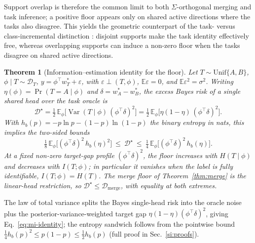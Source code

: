 \documentclass[10pt,a4paper]{article}
\theoremstyle{plain}
\newtheorem{theorem}{Theorem}
\theoremstyle{definition}
\newcommand{\Sig}{\Sigma}
\begin{document}
\noindent Support overlap is therefore the common limit to both
$\Sig$-orthogonal merging and task inference; a positive floor appears only on shared
active directions where the tasks also disagree. This yields the geometric counterpart
of the task- versus class-incremental distinction \cite{vandeven2022}: disjoint
supports make the task identity effectively free, whereas overlapping supports can
induce a non-zero floor when the tasks disagree on shared active directions.

\begin{theorem}[Information--estimation identity for the floor]
\label{thm:mi}
Let $T\sim\mathrm{Unif}\{A,B\}$, $\phi\mid T\sim\mathcal D_T$,
$y=\phi^\top w_T^\ast+\varepsilon$, with $\varepsilon\perp(T,\phi)$,
$\mathbb{E}\varepsilon=0$, and $\mathbb{E}\varepsilon^2=\sigma^2$. Writing
$\eta(\phi)=\Pr(T{=}A\mid\phi)$ and $\delta=w_A^\ast-w_B^\ast$, the excess Bayes risk
of a single shared head over the task oracle is
\begin{equation}
\mathcal{D}^\star
=\tfrac12\,\mathbb{E}_\phi\!\big[\operatorname{Var}(T\!\mid\!\phi)\,(\phi^\top\delta)^2\big]
=\tfrac12\,\mathbb{E}_\phi\!\big[\eta(1-\eta)\,(\phi^\top\delta)^2\big].
\label{eq:mi-identity}
\end{equation}
With $h_b(p)=-p\ln p-(1-p)\ln(1-p)$ the binary entropy in nats, this implies the
two-sided bounds
\begin{equation}
\tfrac18\,\mathbb{E}_\phi\!\big[(\phi^\top\delta)^2\,h_b(\eta)^2\big]\ \le\
\mathcal{D}^\star\ \le\
\tfrac14\,\mathbb{E}_\phi\!\big[(\phi^\top\delta)^2\,h_b(\eta)\big].
\label{eq:mi-sandwich}
\end{equation}
At a fixed non-zero target-gap profile $(\phi^\top\delta)^2$, the floor increases with
$H(T\!\mid\!\phi)$ and decreases with $I(T;\phi)$; in particular it vanishes when the
label is fully identifiable, $I(T;\phi)=H(T)$. The merge floor of
Theorem~\ref{thm:merge} is the linear-head restriction, so
$\mathcal{D}^\star\le\mathcal{D}_{\mathrm{merge}}$, with equality at both extremes.
\end{theorem}
\noindent The law of total variance splits the Bayes single-head risk into
the oracle noise plus the posterior-variance-weighted target gap
$\eta(1-\eta)(\phi^\top\delta)^2$, giving Eq.~\eqref{eq:mi-identity}; the entropy sandwich
follows from the pointwise bound $\tfrac14 h_b(p)^2\le p(1-p)\le\tfrac12 h_b(p)$
(full proof in Sec.~\ref{si:proofs}).
\end{document}
